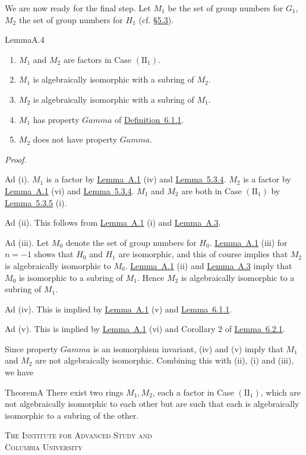 \documentclass[b5paper,twoside]{article}
\newcommand{\secref}[2]{\hyperref[#1]{\mbox{\S#2}}}
\newcommand{\lemref}[2]{\hyperref[#1]{\mbox{Lemma~#2}}}
\newcommand{\defref}[2]{\hyperref[#1]{\mbox{Definition~#2}}}
\theoremstyle{mvnplain}
\renewenvironment{proof}[1][Proof]{%
  \par\addvspace{0.35\baselineskip}%
  \noindent\textit{#1.}\ \normalfont\ignorespaces
}{%
  \par\addvspace{0.35\baselineskip}%
}
\newcommand{\M}{\mathbf M}
\def\M{M}%
\def\Gamma{Gamma}%
\def\mathfrak#1{#1}%
\begin{document}
We are now ready for the final step. Let $\M_1$ be the set of group numbers
for $\mathfrak G_1$, $\M_2$ the set of group numbers for
$\mathfrak H_1$ (cf. \secref{sec:5.3}{5.3}).

\begin{namedstatement}{Lemma}{A.4}\label{lem:A.4}
\begin{enumerate}[label=(\roman*),leftmargin=3em]
\item $\M_1$ and $\M_2$ are factors in Case $(\mathrm{II}_1)$.
\item $\M_1$ is algebraically isomorphic with a subring of $\M_2$.
\item $\M_2$ is algebraically isomorphic with a subring of $\M_1$.
\item $\M_1$ has property $\Gamma$ of \defref{def:6.1.1}{6.1.1}.
\item $\M_2$ does not have property $\Gamma$.
\end{enumerate}
\end{namedstatement}

\begin{proof}
Ad (i). $\M_1$ is a factor by \lemref{lem:A.1}{A.1} (iv) and
\lemref{lem:5.3.4}{5.3.4}. $\M_2$ is a factor by \lemref{lem:A.1}{A.1} (vi)
and \lemref{lem:5.3.4}{5.3.4}. $\M_1$ and $\M_2$ are both in Case
$(\mathrm{II}_1)$ by \lemref{lem:5.3.5}{5.3.5} (i).

Ad (ii). This follows from \lemref{lem:A.1}{A.1} (i) and
\lemref{lem:A.3}{A.3}.

Ad (iii). Let $\M_0$ denote the set of group numbers for
$\mathfrak H_0$. \lemref{lem:A.1}{A.1} (iii) for $n=-1$ shows
that $\mathfrak H_0$ and $\mathfrak H_1$ are
isomorphic, and this of course implies that $\M_2$ is algebraically isomorphic
to $\M_0$. \lemref{lem:A.1}{A.1} (ii) and \lemref{lem:A.3}{A.3} imply that
$\M_0$ is isomorphic to a subring of $\M_1$. Hence $\M_2$ is algebraically
isomorphic to a subring of $\M_1$.

Ad (iv). This is implied by \lemref{lem:A.1}{A.1} (v) and
\lemref{lem:6.1.1}{6.1.1}.

Ad (v). This is implied by \lemref{lem:A.1}{A.1} (vi) and Corollary 2 of
\lemref{lem:6.2.1}{6.2.1}.

Since property $\Gamma$ is an isomorphism invariant, (iv) and (v) imply that
$\M_1$ and $\M_2$ are not algebraically isomorphic. Combining this with (ii),
(i) and (iii), we have
\end{proof}

\begin{namedstatement}{Theorem}{A}\label{thm:A}
There exist two rings $\M_1,\M_2$, each a factor in Case $(\mathrm{II}_1)$,
which are not algebraically isomorphic to each other but are such that each is
algebraically isomorphic to a subring of the other.
\end{namedstatement}

\bigskip
\noindent\textsc{The Institute for Advanced Study and}\\
\textsc{Columbia University}
\end{document}
